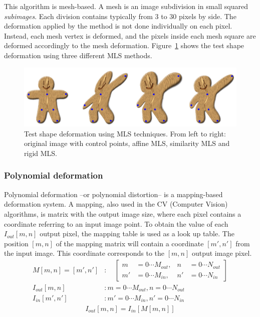 This algorithm is mesh-based. A mesh is an image subdivision in small squared \emph{subimages}. Each division contains typically from 3 to 30 pixels by side. The deformation applied by the method is not done individually on each pixel. Instead, each mesh vertex is deformed, and the pixels inside each mesh square are deformed accordingly to the mesh deformation. Figure~\ref{fig:mls} shows the test shape deformation using three different MLS methods.
\begin{figure}[h]
\centering
\includegraphics[width=\textwidth]{images/mls}
\caption{Test shape deformation using MLS techniques. From left to right: original image with control points, affine MLS, similarity MLS and rigid MLS.}
\label{fig:mls}
\end{figure}


\subsubsection{Polynomial deformation}\label{sec:statepoly}
Polynomial deformation --or polynomial distortion-- \cite{imagemagick} is a mapping-based deformation system. A mapping, also used in the CV (Computer Vision) algorithms, is matrix with the output image size, where each pixel contains a coordinate referring to an input image point. To obtain the value of each $I_{out}[m,n]$ output pixel, the mapping table is used as a look up table. The position $[m,n]$ of the mapping matrix will contain a coordinate $[m',n']$ from the input image. This coordinate corresponds to the $[m,n]$ output image pixel.
\begin{align}
M[m,n]=[m',n'] &: \quad \left[ \begin{aligned}
    m&=0\cdots M_{out},&  n&=0\cdots N_{out} \\
    m'&=0\cdots M_{in},&  n'&=0\cdots N_{in}
  \end{aligned}\right]\\
I_{out}[m,n] &: m=0\cdots M_{out},  n=0\cdots N_{out}\\
I_{in}[m',n'] &: m'=0\cdots M_{in},  n'=0\cdots N_{in}
\end{align}
\begin{align}
I_{out}[m,n]=I_{in}\left[M[m,n]\right]
\end{align}

